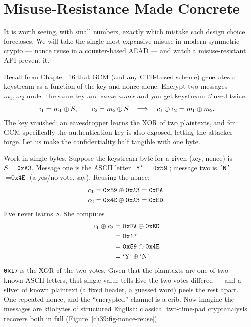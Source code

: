\section{Misuse-Resistance Made Concrete}
\label{ch39:misuse}

It is worth seeing, with small numbers, exactly which mistake each design choice
forecloses. We will take the single most expensive misuse in modern symmetric
crypto --- nonce reuse in a counter-based AEAD --- and watch a misuse-resistant API
prevent it.

Recall from Chapter~16 that GCM (and any CTR-based
scheme) generates a keystream as a function of the key and nonce alone. Encrypt two
messages $m_1, m_2$ under the same key and \emph{same nonce} and you get keystream
$S$ used twice:
\[
c_1 = m_1 \oplus S, \qquad c_2 = m_2 \oplus S
\quad\Longrightarrow\quad
c_1 \oplus c_2 = m_1 \oplus m_2 .
\]
The key vanished; an eavesdropper learns the XOR of two plaintexts, and for GCM
specifically the authentication key is also exposed, letting the attacker forge.
Let us make the confidentiality half tangible with one byte.

\begin{example}
\label{ch39:nonce-reuse-ex}
Work in single bytes. Suppose the keystream byte for a given (key, nonce) is
$S = \texttt{0xA3}$. Message one is the ASCII letter \texttt{'Y'} $= \texttt{0x59}$;
message two is \texttt{'N'} $= \texttt{0x4E}$ (a yes/no vote, say). Reusing the
nonce:
\begin{align*}
c_1 &= \texttt{0x59} \oplus \texttt{0xA3} = \texttt{0xFA} \\
c_2 &= \texttt{0x4E} \oplus \texttt{0xA3} = \texttt{0xED}.
\end{align*}
Eve never learns $S$. She computes
\begin{align*}
c_1 \oplus c_2 &= \texttt{0xFA} \oplus \texttt{0xED} \\
             &= \texttt{0x17} \\
             &= \texttt{0x59} \oplus \texttt{0x4E} \\
             &= \text{`Y'} \oplus \text{`N'} .
\end{align*}
\texttt{0x17} is the XOR of the two votes. Given that the plaintexts are one of two
known ASCII letters, that single value tells Eve the two votes differed --- and a
sliver of known plaintext (a fixed header, a guessed word) peels the rest apart.
One repeated nonce, and the ``encrypted'' channel is a crib. Now imagine the
messages are kilobytes of structured English: classical two-time-pad cryptanalysis
recovers both in full (Figure~\ref{ch39:fig-nonce-reuse}).
\end{example}

